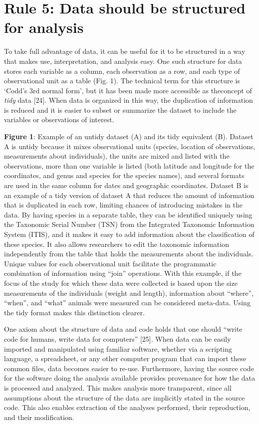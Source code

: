 \documentclass[10pt,letterpaper]{article}
\begin{document}
\section*{Rule 5: Data should be structured for
analysis}\label{rule-5-data-should-be-structured-for-analysis}

To take full advantage of data, it can be useful for it to be structured
in a way that makes use, interpretation, and analysis easy. One such
structure for data stores each variable as a column, each observation as
a row, and each type of observational unit as a table (Fig. 1). The
technical term for this structure is `Codd's 3rd normal form', but it
has been made more accessible as theconcept of \emph{tidy} data
{[}24{]}. When data is organized in this way, the duplication of
information is reduced and it is easier to subset or summarize the
dataset to include the variables or observations of interest.

\textbf{Figure 1}: Example of an untidy dataset (A) and its tidy
equivalent (B). Dataset A is untidy because it mixes observational units
(species, location of observations, measurements about individuals), the
units are mixed and listed with the observations, more than one variable
is listed (both latitude and longitude for the coordinates, and genus
and species for the species names), and several formats are used in the
same column for dates and geographic coordinates. Dataset B is an
example of a tidy version of dataset A that reduces the amount of
information that is duplicated in each row, limiting chances of
introducing mistakes in the data. By having species in a separate table,
they can be identified uniquely using the Taxonomic Serial Number (TSN)
from the Integrated Taxonomic Information System (ITIS), and it makes it
easy to add information about the classification of these species. It
also allows researchers to edit the taxonomic information independently
from the table that holds the measurements about the individuals. Unique
values for each observational unit facilitate the programmatic
combination of information using ``join'' operations. With this example,
if the focus of the study for which these data were collected is based
upon the size measurements of the individuals (weight and length),
information about ``where'', ``when'', and ``what'' animals were
measured can be considered meta-data. Using the tidy format makes this
distinction clearer.

One axiom about the structure of data and code holds that one should
``write code for humans, write data for computers'' {[}25{]}. When data
can be easily imported and manipulated using familiar software, whether
via a scripting language, a spreadsheet, or any other computer program
that can import these common files, data becomes easier to re-use.
Furthermore, having the source code for the software doing the analysis
available provides provenance for how the data is processed and
analyzed. This makes analysis more transparent, since all assumptions
about the structure of the data are implicitly stated in the source
code. This also enables extraction of the analyses performed, their
reproduction, and their modification.
\end{document}
